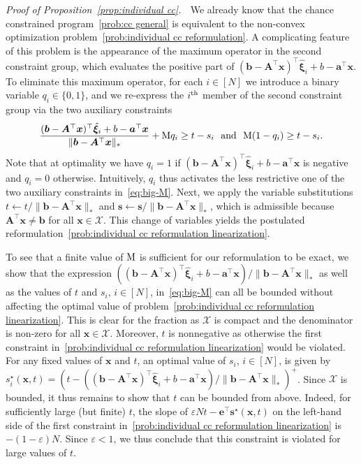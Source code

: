 \documentclass[nonblindrev]{informs2017}
\newcommand{\bmh}[1]{\hat{\bm{#1}}}
\newcommand{\1}[1]{\mathds{1}{\left(#1\right)}}
\begin{document}
\noindent \emph{Proof of Proposition~\ref{prop:individual cc}.} $\;$
We already know that the chance constrained program~\eqref{prob:cc general} is equivalent to the non-convex optimization problem~\eqref{prob:individual cc reformulation}. A complicating feature of this problem is the appearance of the maximum operator in the second constraint group, which evaluates the positive part of $(\bm{b} - \bm{A}^\top\bm{x})^\top\bmh{\xi}_i + b - \bm{a}^\top\bm{x}$. To eliminate this maximum operator, for each $i\in[N]$ we introduce a binary variable $q_i \in \{0,1\}$, and we re-express the $i^{\rm th}$ member of the second constraint group via the two auxiliary constraints
\begin{equation}\label{eq:big-M}
\dfrac{(\bm{b} - \bm{A}^\top\bm{x})^\top\bmh{\xi}_i + b - \bm{a}^\top\bm{x}}{\|\bm{b} - \bm{A}^\top\bm{x}\|_*} + {\rm M} q_i \geq t - s_i 
\text{~~and~~} {\rm M} (1 - q_i) \geq t - s_i.
\end{equation}
Note that at optimality we have $q_i=1$ if $(\bm{b} - \bm{A}^\top\bm{x})^\top\bmh{\xi}_i + b - \bm{a}^\top\bm{x}$ is negative and $q_i=0$ otherwise. Intuitively, $q_i$ thus activates the less restrictive one of the two auxiliary constraints in~\eqref{eq:big-M}.
Next, we apply the variable substitutions $t\leftarrow t/\|\bm{b} - \bm{A}^\top\bm{x}\|_*$ and $\bm{s}\leftarrow \bm{s}/\|\bm{b} - \bm{A}^\top\bm{x}\|_*$, which is admissible because $\bm{A}^\top\bm{x} \ne \bm{b}$ for all $\bm{x} \in \mathcal{X}$. This change of variables yields the postulated reformulation~\eqref{prob:individual cc reformulation linearization}. 

To see that a finite value of $\rm M$ is sufficient for our reformulation to be exact, we show that the expression $((\bm{b} - \bm{A}^\top\bm{x})^\top\bmh{\xi}_i + b - \bm{a}^\top\bm{x}) / \|\bm{b} - \bm{A}^\top\bm{x}\|_*$ as well as the values of $t$ and $s_i$, $i \in [N]$, in~\eqref{eq:big-M} can all be bounded without affecting the optimal value of problem~\eqref{prob:individual cc reformulation linearization}. This is clear for the fraction as $\mathcal{X}$ is compact and the denominator is non-zero for all $\bm{x} \in \mathcal{X}$. Moreover, $t$ is nonnegative as otherwise the first constraint in~\eqref{prob:individual cc reformulation linearization} would be violated. For any fixed values of $\bm{x}$ and $t$, an optimal value of $s_i$, $i \in [N]$, is given by $s_i^\star (\bm{x}, t) = ( t -  ((\bm{b} - \bm{A}^\top\bm{x})^\top\bmh{\xi}_i + b - \bm{a}^\top\bm{x}) / \|\bm{b} - \bm{A}^\top\bm{x}\|_*)^+$. Since $\mathcal{X}$ is bounded, it thus remains to show that $t$ can be bounded from above. Indeed, for sufficiently large (but finite) $t$, the slope of $\varepsilon N t - \bm{e}^\top \bm{s}^\star (\bm{x}, t)$ on the left-hand side of the first constraint in~\eqref{prob:individual cc reformulation linearization} is $- (1 - \varepsilon) N$. Since $\varepsilon < 1$, we thus conclude that this constraint is violated for large values of $t$.
\hfill \Halmos
\endproof
\end{document}
